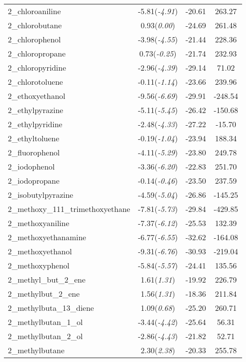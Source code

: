 \documentclass{amsart}
\begin{document}
\begin{center}
\begin{longtable}{l|c|c|c}
2\_chloroaniline & -5.81(\textit{-4.91}) & -20.61 & 263.27 \\ 
2\_chlorobutane & 0.93(\textit{0.00}) & -24.69 & 261.48 \\ 
2\_chlorophenol & -3.98(\textit{-4.55}) & -21.44 & 228.36 \\ 
2\_chloropropane & 0.73(\textit{-0.25}) & -21.74 & 232.93 \\ 
2\_chloropyridine & -2.96(\textit{-4.39}) & -29.14 & 71.02 \\ 
2\_chlorotoluene & -0.11(\textit{-1.14}) & -23.66 & 239.96 \\ 
2\_ethoxyethanol & -9.56(\textit{-6.69}) & -29.91 & -248.54 \\ 
2\_ethylpyrazine & -5.11(\textit{-5.45}) & -26.42 & -150.68 \\ 
2\_ethylpyridine & -2.48(\textit{-4.33}) & -27.22 & -15.70 \\ 
2\_ethyltoluene & -0.19(\textit{-1.04}) & -23.94 & 188.34 \\ 
2\_fluorophenol & -4.11(\textit{-5.29}) & -23.80 & 249.78 \\ 
2\_iodophenol & -3.36(\textit{-6.20}) & -22.83 & 251.70 \\ 
2\_iodopropane & -0.14(\textit{-0.46}) & -23.50 & 237.59 \\ 
2\_isobutylpyrazine & -4.59(\textit{-5.04}) & -26.86 & -145.25 \\ 
2\_methoxy\_111\_trimethoxyethane & -7.81(\textit{-5.73}) & -29.84 & -429.85 \\ 
2\_methoxyaniline & -7.37(\textit{-6.12}) & -25.53 & 132.39 \\ 
2\_methoxyethanamine & -6.77(\textit{-6.55}) & -32.62 & -164.08 \\ 
2\_methoxyethanol & -9.31(\textit{-6.76}) & -30.93 & -219.04 \\ 
2\_methoxyphenol & -5.84(\textit{-5.57}) & -24.41 & 135.56 \\ 
2\_methyl\_but\_2\_ene & 1.61(\textit{1.31}) & -19.92 & 226.79 \\ 
2\_methylbut\_2\_ene & 1.56(\textit{1.31}) & -18.36 & 211.84 \\ 
2\_methylbuta\_13\_diene & 1.09(\textit{0.68}) & -25.20 & 260.71 \\ 
2\_methylbutan\_1\_ol & -3.44(\textit{-4.42}) & -25.64 & 56.31 \\ 
2\_methylbutan\_2\_ol & -2.86(\textit{-4.43}) & -21.82 & 52.71 \\ 
2\_methylbutane & 2.30(\textit{2.38}) & -20.33 & 255.78 \\ 

\end{longtable}
\end{center}
\end{document}
